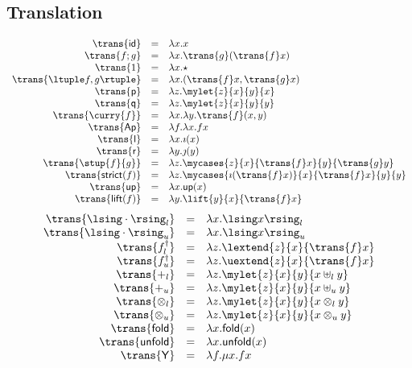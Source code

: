 \subsection*{Translation}
\[ \begin{array}{rcl}
\trans{{\sf id}} & = & \lambda x.x  \\
\trans{f;g} & = & \lambda x. \trans{g}(\trans{f} x) \\
\trans{1} & = & \lambda x. \star  \\
\trans{\ltuple f, g \rtuple} & = & \lambda x. (\trans{f} x, \trans{g} x) \\
\trans{{\sf p}} & = & \lambda z. \mylet{z}{x}{y}{x} \\
\trans{{\sf q}} & = & \lambda z. \mylet{z}{x}{y}{y}  \\
\trans{\curry{f}} & = & \lambda x. \lambda y. \trans{f} (x, y)  \\
\trans{{\sf Ap}} & = & \lambda f. \lambda x. f x \\
\trans{{\sf l}} & = & \lambda x. \imath (x) \\
\trans{{\sf r}} & = & \lambda y. \jmath (y) \\
\trans{\stup{f}{g}} & = & \lambda z. \mycases{z}{x}{\trans{f} x}{y}{\trans{g} y} \\
\trans{{\sf strict}(f)} & = & \lambda z. \mycases{\imath (\trans{f} x)}{x}{\trans{f} x}{y}{y} \\
\trans{{\sf up}} & = & \lambda x. {\sf up}(x) \\
\trans{{\sf lift}(f)} & = & \lambda y. \lift{y}{x}{\trans{f} x} \\
\end{array} \]
\[ \begin{array}{rcl}
\trans{\lsing \cdot \rsing_{l}} & = & \lambda x. \lsing x \rsing_{l} \\
\trans{\lsing \cdot \rsing_{u}} & = & \lambda x. \lsing x \rsing_{u} \\
\trans{f^{\dagger}_{l}} & = & \lambda z. \lextend{z}{x}{\trans{f} x} \\
\trans{f^{\dagger}_{u}} & = & \lambda z. \uextend{z}{x}{\trans{f} x} \\
\trans{+_{l}} & = & \lambda z. \mylet{z}{x}{y}{x \uplus_{l} y} \\
\trans{+_{u}} & = & \lambda z. \mylet{z}{x}{y}{x \uplus_{u} y} \\
\trans{\otimes_{l}} & = & \lambda z. \mylet{z}{x}{y}{x \otimes_{l} y} \\
\trans{\otimes_{u}} & = & \lambda z. \mylet{z}{x}{y}{x \otimes_{u} y} \\
\trans{{\sf fold}} & = & \lambda x. {\sf fold}(x) \\
\trans{{\sf unfold}} & = & \lambda x. {\sf unfold}(x) \\
\trans{{\sf Y}} & = & \lambda f. \mu x. f x 
\end{array} \]
